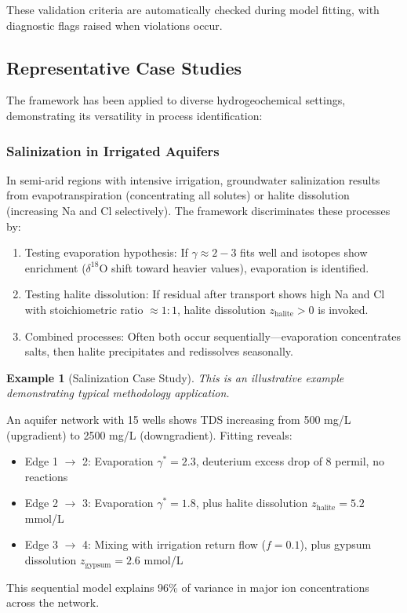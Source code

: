 \documentclass[12pt,a4paper]{article}
\theoremstyle{plain}
\theoremstyle{definition}
\newtheorem{example}[theorem]{Example}
\theoremstyle{remark}
\begin{document}
These validation criteria are automatically checked during model fitting, with diagnostic flags raised when violations occur.

\subsection{Representative Case Studies}

The framework has been applied to diverse hydrogeochemical settings, demonstrating its versatility in process identification:

\subsubsection{Salinization in Irrigated Aquifers}

In semi-arid regions with intensive irrigation, groundwater salinization results from evapotranspiration (concentrating all solutes) or halite dissolution (increasing Na and Cl selectively). The framework discriminates these processes by:
\begin{enumerate}
	\item Testing evaporation hypothesis: If $\gamma \approx 2-3$ fits well and isotopes show enrichment ($\delta^{18}$O shift toward heavier values), evaporation is identified.
	\item Testing halite dissolution: If residual after transport shows high Na and Cl with stoichiometric ratio $\approx 1:1$, halite dissolution $z_{\text{halite}} > 0$ is invoked.
	\item Combined processes: Often both occur sequentially---evaporation concentrates salts, then halite precipitates and redissolves seasonally.
\end{enumerate}

\begin{example}[Salinization Case Study]
	\textit{This is an illustrative example demonstrating typical methodology application.}

	An aquifer network with 15 wells shows TDS increasing from 500 mg/L (upgradient) to 2500 mg/L (downgradient). Fitting reveals:
	\begin{itemize}
		\item Edge 1 $\to$ 2: Evaporation $\gamma^* = 2.3$, deuterium excess drop of 8 permil, no reactions
		\item Edge 2 $\to$ 3: Evaporation $\gamma^* = 1.8$, plus halite dissolution $z_{\text{halite}} = 5.2$ mmol/L
		\item Edge 3 $\to$ 4: Mixing with irrigation return flow ($f = 0.1$), plus gypsum dissolution $z_{\text{gypsum}} = 2.6$ mmol/L
	\end{itemize}
	This sequential model explains 96\% of variance in major ion concentrations across the network.
\end{example}
\end{document}
